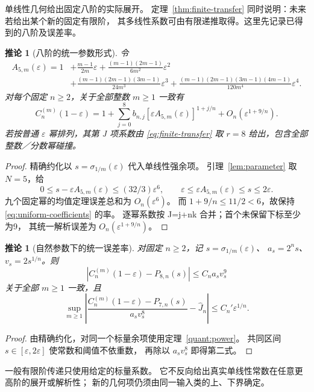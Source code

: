 \documentclass[UTF8,11pt,fontset=none]{ctexart}
\newtheorem{corollary}[theorem]{推论}
\theoremstyle{remark}
\newcommand{\eps}{\varepsilon}
\begin{document}
单线性几何给出固定八阶的实际展开。
定理~\ref{thm:finite-transfer} 同时说明：未来若给出某个新的固定有限阶，
其多线性系数可由有限递推取得。这里先记录已得到的八阶及误差率。

\begin{corollary}[八阶的统一参数形式]\label{cor:uniform}
令
\begin{equation}\label{eq:quinticparameter}
 \begin{aligned}
 A_{5,m}(\eps)=1&+\frac{m-1}{2m}\eps
 +\frac{(m-1)(2m-1)}{6m^2}\eps^2\\
 &+\frac{(m-1)(2m-1)(3m-1)}{24m^3}\eps^3
 +\frac{(m-1)(2m-1)(3m-1)(4m-1)}{120m^4}\eps^4 .
 \end{aligned}
\end{equation}
对每个固定 \(n\ge2\)，关于全部整数 \(m\ge1\) 一致有
\begin{equation}\label{eq:uniform-coefficients}
 C_n^{(m)}(1-\eps)=1+\sum_{j=0}^8b_{n,j}
       [\eps A_{5,m}(\eps)]^{1+j/n}
       +O_n(\eps^{1+9/n}).
\end{equation}
若按普通 \(\eps\) 幂排列，其第 J 项系数由
\eqref{eq:finite-transfer} 取 \(r=8\) 给出，包含全部整数／分数幂碰撞。
\end{corollary}
\begin{proof}
精确约化以 \(s=\sigma_{1/m}(\eps)\) 代入单线性强余项。
引理~\ref{lem:parameter} 取 \(N=5\)，给
\[
 0\le s-\eps A_{5,m}(\eps)\le(32/3)\eps^6,\qquad
 \eps\le\eps A_{5,m}(\eps)\le s\le2\eps.
\]
九个固定幂的均值定理误差总和为 \(O_n(\eps^6)\)。
而 \(1+9/n\le11/2<6\)，故保持
\eqref{eq:uniform-coefficients} 的率。
逐幂系数按 J=j+nk 合并；首个未保留下标至少为9，
其统一解析误差为 \(O_n(\eps^{1+9/n})\)。
\end{proof}

\begin{corollary}[自然参数下的统一误差率]\label{cor:eighth-multi}
对固定 \(n\ge2\)，记 \(s=\sigma_{1/m}(\eps)\)、
\(a_s=2^ns\)、\(v_s=2s^{1/n}\)。则
\[
 |C_n^{(m)}(1-\eps)-P_{8,n}(s)|\le C_n a_s v_s^9
\]
关于全部 \(m\ge1\) 一致，且
\[
 \sup_{m\ge1}\left|
 \frac{C_n^{(m)}(1-\eps)-P_{7,n}(s)}{a_sv_s^8}
                  -\widehat J_n\right|
 \le C_n'\eps^{1/n}.
\]
\end{corollary}
\begin{proof}
由精确约化，对同一个标量余项使用定理~\ref{quant:power}。
共同区间 \(s\in[\eps,2\eps]\) 使常数和阈值不依重数，
再除以 \(a_sv_s^8\) 即得第二式。
\end{proof}

一般有限阶传递只使用给定的标量系数。
它不反向给出真实单线性常数在任意更高阶的展开或解析性；
新的几何项仍须由同一输入类的上、下界确定。



\end{document}
